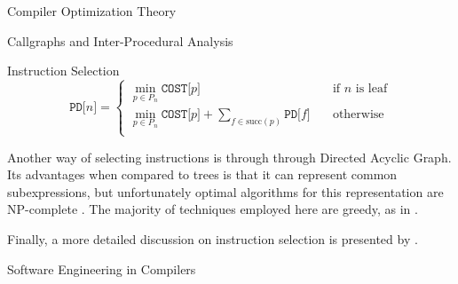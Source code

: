 \begin{section}{Compiler Optimization Theory}
\begin{section}{Callgraphs and Inter-Procedural Analysis}
\begin{subsection}{Instruction Selection}
\[
    \texttt{PD[}n\texttt{]} =
     \begin{cases}
       \min_{p \in P_n} \texttt{COST[}p\texttt{]}  &\quad\text{if } n \text{ is leaf}\\
       \min_{p \in P_n} \texttt{COST[}p\texttt{]} + \sum_{f \in \text{succ}(p)} \texttt{PD[}f\texttt{]} &\quad\text{otherwise}\\
     \end{cases}
\]


	Another way of selecting instructions is through through Directed Acyclic Graph.
	Its advantages when compared to trees is that it can represent common
	subexpressions, but unfortunately optimal algorithms for this representation
	are NP-complete \citep{koes2008near}. The majority of techniques employed here
	are greedy, as in \cite{llvm_insn_selection}.

	Finally, a more detailed discussion on instruction selection is presented
	by \cite{blindell2016instruction}.

\end{subsection}

\end{section}

\begin{section}{Software Engineering in Compilers}






\end{section}
\end{section}
